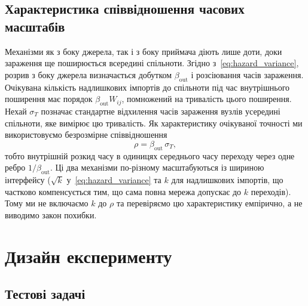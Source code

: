\subsection{Характеристика співвідношення часових масштабів}
\label{sec:descriptor}

Механізми як з боку джерела, так і з боку приймача діють лише доти, доки зараження ще поширюється всередині спільноти. Згідно з~\eqref{eq:hazard_variance}, розрив з боку джерела визначається добутком $\beta_{\mathrm{out}}$ і розсіювання часів зараження. Очікувана кількість надлишкових імпортів до спільноти під час внутрішнього поширення має порядок $\beta_{\mathrm{out}}W_{ij}$, помножений на тривалість цього поширення. Нехай $\sigma_T$ позначає стандартне відхилення часів зараження вузлів усередині спільноти, яке вимірює цю тривалість. Як характеристику очікуваної точності ми використовуємо безрозмірне співвідношення
\begin{equation}
\label{eq:rho}
\rho=\beta_{\mathrm{out}}\,\sigma_T,
\end{equation}
тобто внутрішній розкид часу в одиницях середнього часу переходу через одне ребро $1/\beta_{\mathrm{out}}$. Ці два механізми по-різному масштабуються із шириною інтерфейсу ($\sqrt{k}$ у~\eqref{eq:hazard_variance} та $k$ для надлишкових імпортів, що частково компенсується тим, що сама повна мережа допускає до $k$ переходів). Тому ми не включаємо $k$ до $\rho$ та перевіряємо цю характеристику емпірично, а не виводимо закон похибки.

\clearpage
\section{Дизайн експерименту}
\label{sec:design}

\subsection{Тестові задачі}

